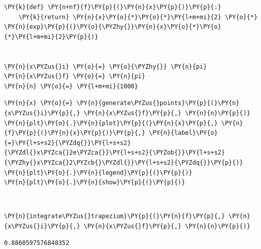     \begin{tcolorbox}[breakable, size=fbox, boxrule=1pt, pad at break*=1mm,colback=cellbackground, colframe=cellborder]
\begin{Verbatim}[commandchars=\\\{\}]
\PY{k}{def} \PY{n+nf}{f}\PY{p}{(}\PY{n}{x}\PY{p}{)}\PY{p}{:}
    \PY{k}{return} \PY{n}{x}\PY{o}{*}\PY{o}{*}\PY{l+m+mi}{2} \PY{o}{*} \PY{n}{exp}\PY{p}{(}\PY{o}{\PYZhy{}}\PY{n}{x}\PY{o}{*}\PY{o}{*}\PY{l+m+mi}{2}\PY{p}{)}


\PY{n}{x\PYZus{}i} \PY{o}{=} \PY{o}{\PYZhy{}} \PY{n}{pi}
\PY{n}{x\PYZus{}f} \PY{o}{=} \PY{n}{pi}
\PY{n}{n} \PY{o}{=} \PY{l+m+mi}{1000}
\end{Verbatim}
\end{tcolorbox}

    \begin{tcolorbox}[breakable, size=fbox, boxrule=1pt, pad at break*=1mm,colback=cellbackground, colframe=cellborder]
\begin{Verbatim}[commandchars=\\\{\}]
\PY{n}{x} \PY{o}{=} \PY{n}{generate\PYZus{}points}\PY{p}{(}\PY{n}{x\PYZus{}i}\PY{p}{,} \PY{n}{x\PYZus{}f}\PY{p}{,} \PY{n}{n}\PY{p}{)}
\PY{n}{plt}\PY{o}{.}\PY{n}{plot}\PY{p}{(}\PY{n}{x}\PY{p}{,} \PY{n}{f}\PY{p}{(}\PY{n}{x}\PY{p}{)}\PY{p}{,} \PY{n}{label}\PY{o}{=}\PY{l+s+s2}{\PYZdq{}}\PY{l+s+s2}{\PYZdl{}x\PYZca{}2e\PYZca{}}\PY{l+s+s2}{\PYZob{}}\PY{l+s+s2}{\PYZhy{}x\PYZca{}2\PYZcb{}\PYZdl{}}\PY{l+s+s2}{\PYZdq{}}\PY{p}{)}
\PY{n}{plt}\PY{o}{.}\PY{n}{legend}\PY{p}{(}\PY{p}{)}
\PY{n}{plt}\PY{o}{.}\PY{n}{show}\PY{p}{(}\PY{p}{)}
\end{Verbatim}
\end{tcolorbox}

    \begin{center}
    \end{center}
    { \hspace*{\fill} \\}
    
    \begin{tcolorbox}[breakable, size=fbox, boxrule=1pt, pad at break*=1mm,colback=cellbackground, colframe=cellborder]
\begin{Verbatim}[commandchars=\\\{\}]
\PY{n}{integrate\PYZus{}trapezium}\PY{p}{(}\PY{n}{f}\PY{p}{,} \PY{n}{x\PYZus{}i}\PY{p}{,} \PY{n}{x\PYZus{}f}\PY{p}{,} \PY{n}{n}\PY{p}{)}
\end{Verbatim}
\end{tcolorbox}

            \begin{tcolorbox}[breakable, size=fbox, boxrule=.5pt, pad at break*=1mm, opacityfill=0]
\begin{Verbatim}[commandchars=\\\{\}]
0.8860597576848352
\end{Verbatim}
\end{tcolorbox}
        

    
    
    
